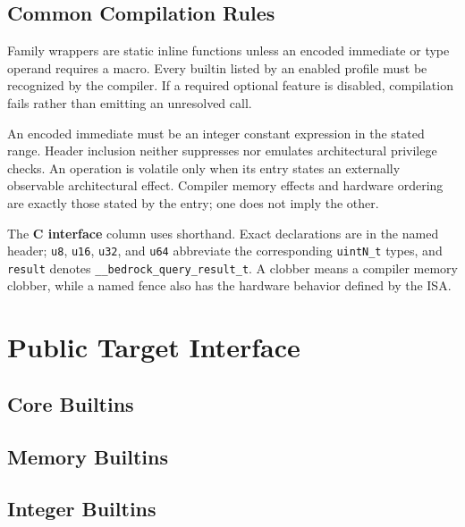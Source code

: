 \documentclass[10pt,twoside]{article}
\begin{document}
\BedrockGeneratedHeaderFamilies{}

\subsection{Common Compilation Rules}
Family wrappers are static inline functions unless an encoded immediate or
type operand requires a macro. Every builtin listed by an enabled profile must
be recognized by the compiler. If a required optional feature is disabled,
compilation fails rather than emitting an unresolved call.

An encoded immediate must be an integer constant expression in the stated
range. Header inclusion neither suppresses nor emulates architectural
privilege checks. An operation is volatile only when its entry states an
externally observable architectural effect. Compiler memory effects and
hardware ordering are exactly those stated by the entry; one does not imply
the other.

The \textbf{C interface} column uses
\texttt{} shorthand. Exact declarations are in the
named header; \texttt{u8}, \texttt{u16}, \texttt{u32}, and \texttt{u64}
abbreviate the corresponding \texttt{uintN\_t} types, and \texttt{result}
denotes \texttt{\_\_bedrock\_query\_result\_t}. A clobber means a compiler
memory clobber, while a named fence also has the hardware behavior defined by
the ISA.

\section{Public Target Interface}\label{page:public-target-interface}

\subsection{Core Builtins}

\subsection{Memory Builtins}

\subsection{Integer Builtins}
\end{document}

